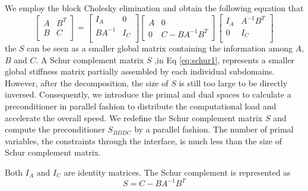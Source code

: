 We employ the block Cholesky elimination and obtain the following equation that
\begin{equation}\label{eq:schur1}
\begin{bmatrix}
A & B^{T} \\ B & C \\
\end{bmatrix} = 
\begin{bmatrix}
I_{A} & 0 \\ BA^{-1} & I_{C}\\
\end{bmatrix} \begin{bmatrix}
A & 0 \\ 0 & C - BA^{-1} B^{T}
\end{bmatrix}
\begin{bmatrix}
I_{A} & A^{-1} B^{T} \\ 0 & I_{C} \\
\end{bmatrix}
\end{equation}
the $ S $ can be seen as a smaller global matrix containing the information among $ A $, $ B $ and $ C $. A Schur complement matrix $ S $ ,in Eq \eqref{eq:schur1}, represents a smaller global stiffness matrix partially assembled by each individual subdomains. However, after the decomposition, the size of $ S $ is still too large to be directly inversed. Consequently, we introduce the primal and dual spaces to calculate a preconditioner in parallel fashion to distribute the computational load and accelerate the overall speed. We redefine the Schur complement matrix $ S $ and compute the preconditioner $ S_{BDDC} $ by a parallel fashion. The number of primal variables, the constraints through the interface, is much less than the size of Schur complement matrix.

Both $ I_{A} $ and $ I_{C} $ are identity matrices. The Schur complement is represented as
\begin{equation}
\mathit{S} = C - BA^{-1} B^{T}
\end{equation}

